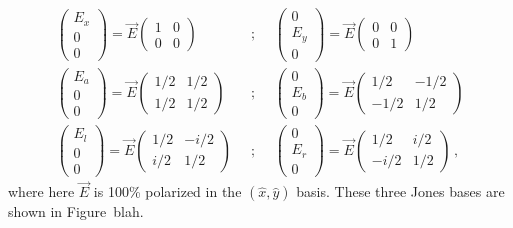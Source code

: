\begin{eqnarray}
    \begin{pmatrix}
    E_{x} \\
    0 \\
    0
    \end{pmatrix}
    =
    \vec{E}
    \begin{pmatrix}
    1 & 0 \\
    0 & 0
    \end{pmatrix}
    \; \; & ; & \; \;
    \begin{pmatrix}
    0 \\
    E_{y} \\
    0
    \end{pmatrix}
    =
    \vec{E}
    \begin{pmatrix}
    0 & 0 \\
    0 & 1
    \end{pmatrix}
    \nonumber \\ %
    \begin{pmatrix}
    E_{a} \\
    0 \\
    0
    \end{pmatrix}
    =
    \vec{E}
    \begin{pmatrix}
    1/2 & 1/2 \\
    1/2 & 1/2
    \end{pmatrix}
    \; \; & ; & \; \;
    \begin{pmatrix}
    0 \\
    E_{b} \\
    0
    \end{pmatrix}
    =
    \vec{E}
    \begin{pmatrix}
    1/2 & -1/2 \\
    -1/2 & 1/2
    \end{pmatrix}
    \label{eq:jones_matrices}
    \\ %
    \begin{pmatrix}
    E_{l} \\
    0 \\
    0
    \end{pmatrix}
    =
    \vec{E}
    \begin{pmatrix}
    1/2 & -i/2 \\
    i/2 & 1/2
    \end{pmatrix}
    \; \; & ; & \; \;
    \begin{pmatrix}
    0 \\
    E_{r} \\
    0
    \end{pmatrix}
    =
    \vec{E}
    \begin{pmatrix}
    1/2 & i/2 \\
    -i/2 & 1/2
    \end{pmatrix} \nonumber \, ,
\end{eqnarray}
where here $\vec{E}$ is 100\% polarized in the $(\hat{x}, \hat{y})$ basis. These three Jones bases are shown in Figure~blah.


